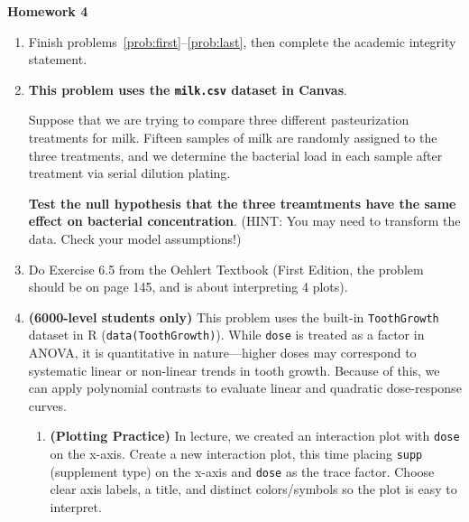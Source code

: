 \documentclass[10pt,twoside]{article}\usepackage[]{graphicx}\usepackage[dvipsnames,svgnames,table]{xcolor}
\begin{document}
\begin{flushright}
\begin{minipage}{.33\textwidth}
\rightline{\today}
\end{minipage}
\end{flushright}

\begin{center}
{\large{\textbf{Homework 4}}}
\end{center}

\begin{enumerate}
  \item Finish problems~\ref{prob:first}--\ref{prob:last}, then complete the academic integrity statement.
  \item \label{prob:first} \textbf{This problem uses the \texttt{milk.csv} dataset in Canvas}. 
  
  Suppose that we are trying to compare three different pasteurization treatments for milk.
  Fifteen samples of milk are randomly assigned to the three treatments, and we determine the bacterial load in each sample after treatment via serial dilution plating.
  
  \textbf{Test the null hypothesis that the three treamtments have the same effect on bacterial concentration}. (HINT: You may need to transform the data. Check your model assumptions!)
  
  \item Do Exercise 6.5 from the Oehlert Textbook (First Edition, the problem should be on page 145, and is about interpreting 4 plots).
  
  \item \label{prob:last} \textbf{(6000-level students only)} This problem uses the built-in \texttt{ToothGrowth} dataset in R (\texttt{data(ToothGrowth)}). 
While \texttt{dose} is treated as a factor in ANOVA, it is quantitative in nature---higher doses may correspond to systematic linear or non-linear trends in tooth growth. 
Because of this, we can apply polynomial contrasts to evaluate linear and quadratic dose-response curves.

\begin{enumerate}
  \item \label{prob:toothFig} \textbf{(Plotting Practice)} In lecture, we created an interaction plot with \texttt{dose} on the x-axis. Create a new interaction plot, this time placing \texttt{supp} (supplement type) on the x-axis and \texttt{dose} as the trace factor. Choose clear axis labels, a title, and distinct colors/symbols so the plot is easy to interpret.


\end{enumerate}
\end{enumerate}
\end{document}
